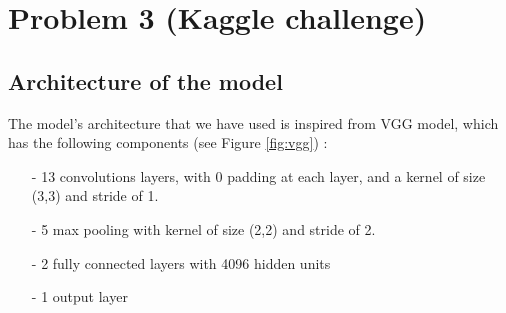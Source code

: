 \documentclass[a4paper]{article}
\begin{document}
\newpage
\section{Problem 3 (Kaggle challenge)}
\label{sec:problem3}

\subsection{Architecture of the model}
The model's architecture that we have used is inspired from VGG model, which has the following components (see Figure \ref{fig:vgg}) :
%
\begin{itemize}
\setlength\itemsep{0em}
	\item[-] 13 convolutions layers, with 0 padding at each layer, and a kernel of size (3,3) and stride of 1.
	\item[-] 5 max pooling with kernel of size (2,2) and stride of 2.
	\item[-] 2 fully connected layers with 4096 hidden units
	\item[-] 1 output layer
\end{itemize}
%
\end{document}
